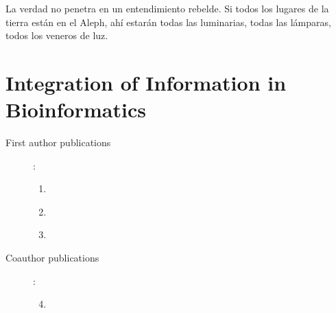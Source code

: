 \begin{savequote}[75mm] 
La verdad no penetra en un entendimiento rebelde. Si todos los lugares de la tierra est\'{a}n en el Aleph, ah\'{i} estar\'{a}n todas las luminarias, todas las l\'{a}mparas, todos los veneros de luz.
\end{savequote}

\chapter{Integration of Information in Bioinformatics} \label{section:integration}


\begin{description}
	\item[First author publications]:\\
		\begin{enumerate}
			\item \label{paper:mydas} 
			\item \label{paper:writeback}
			\item \label{paper:msctheses}
		\end{enumerate}
 	\item[Coauthor publications]:\\
		\begin{enumerate}
			\setcounter{enumi}{3}
			\item \label{paper:dasty3} 
		\end{enumerate}


\end{description}
